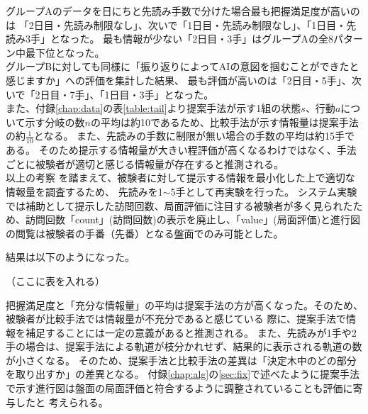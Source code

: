 グループAのデータを日にちと先読み手数で分けた場合最も把握満足度が高いのは
「2日目・先読み制限なし」、次いで「1日目・先読み制限なし」、「1日目・先読み3手」となった。
最も情報が少ない「2日目・3手」はグループAの全8パターン中最下位となった。\\


グループBに対しても同様に「振り返りによってAIの意図を掴むことができたと感じますか」への評価を集計した結果、
最も評価が高いのは「2日目・5手」、次いで「2日目・7手」、「1日目・3手」となった。\\



また、付録\ref{chap:data}の表\ref{table:tail}より提案手法が示す1組の状態$s$、行動$a$について示す分岐の数$n$の平均は約10であるため、比較手法が示す情報量は提案手法の約$\frac{1}{10}$となる。
また、先読みの手数に制限が無い場合の手数の平均は約15手である。
そのため提示する情報量が大きい程評価が高くなるわけではなく、手法ごとに被験者が適切と感じる情報量が存在すると推測される。\\

以上の考察
を踏まえて、被験者に対して提示する情報を最小化した上で適切な情報量を調査するため、
先読みを1$\sim$5手として再実験を行った。
システム実験では補助として提示した訪問回数、局面評価に注目する被験者が多く見られたため、訪問回数「count」(訪問回数)の表示を廃止し、「value」(局面評価)と進行図の閲覧は被験者の手番（先番）となる盤面でのみ可能とした。

結果は以下のようになった。

（ここに表を入れる）


把握満足度と「充分な情報量」の平均は提案手法の方が高くなった。そのため、被験者が比較手法では情報量が不充分であると感じている
際に、提案手法で情報を補足することには一定の意義があると推測される。
また、先読みが1手や2手の場合は、提案手法による軌道が枝分かれせず、結果的に表示される軌道の数が小さくなる。
そのため、提案手法と比較手法の差異は「決定木中のどの部分を取り出すか」の差異となる。
付録\ref{chap:alg}の\ref{sec:fix}で述べたように提案手法で示す進行図は盤面の局面評価と符合するように調整されていることも評価に寄与したと
考えられる。